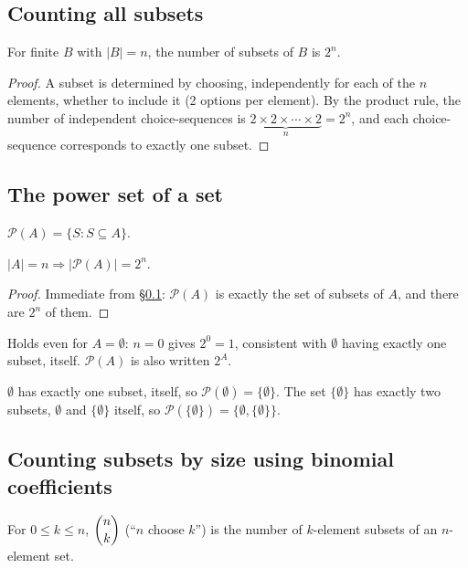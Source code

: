 \documentclass[11pt]{article}
\begin{document}
\subsection{Counting all subsets}
\label{sec:1-8}

\begin{theorem}
For finite $B$ with $|B| = n$, the number of subsets of $B$ is $2^n$.
\end{theorem}
\begin{proof}
A subset is determined by choosing, independently for each of the $n$ elements, whether to include it (2 options per element). By the product rule, the number of independent choice-sequences is $\underbrace{2 \times 2 \times \cdots \times 2}_{n} = 2^n$, and each choice-sequence corresponds to exactly one subset.
\end{proof}

\subsection{The power set of a set}
\label{sec:1-9}
\begin{definition}
$\mathcal{P}(A) = \{S : S \subseteq A\}$.
\end{definition}

\begin{theorem}
$|A| = n \Rightarrow |\mathcal{P}(A)| = 2^n$.
\end{theorem}
\begin{proof}
Immediate from \S\ref{sec:1-8}: $\mathcal{P}(A)$ is exactly the set of subsets of $A$, and there are $2^n$ of them.
\end{proof}

\begin{note}
Holds even for $A = \emptyset$: $n=0$ gives $2^0 = 1$, consistent with $\emptyset$ having exactly one subset, itself. $\mathcal{P}(A)$ is also written $2^A$.
\end{note}

\begin{example}
$\emptyset$ has exactly one subset, itself, so $\mathcal{P}(\emptyset) = \{\emptyset\}$. The set $\{\emptyset\}$ has exactly two subsets, $\emptyset$ and $\{\emptyset\}$ itself, so $\mathcal{P}(\{\emptyset\}) = \{\emptyset, \{\emptyset\}\}$.
\end{example}

\subsection{Counting subsets by size using binomial coefficients}
\label{sec:1-10}
\begin{definition}
For $0 \le k \le n$, $\dbinom{n}{k}$ (``$n$ choose $k$'') is the number of $k$-element subsets of an $n$-element set.
\end{definition}
\end{document}
